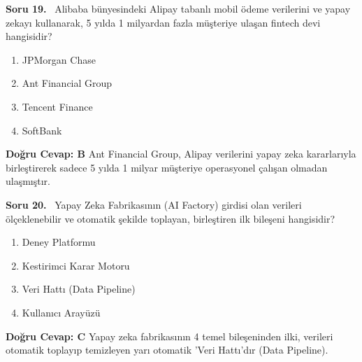 \documentclass[11pt,a4paper,openany]{book}
\begin{document}
\needspace{5cm}
\vspace{8pt}
\noindent\textbf{\large\sffamily Soru 19.} \ Alibaba bünyesindeki Alipay tabanlı mobil ödeme verilerini ve yapay zekayı kullanarak, 5 yılda 1 milyardan fazla müşteriye ulaşan fintech devi hangisidir?
\begin{enumerate}[label=\Alph*), leftmargin=25pt, topsep=4pt, itemsep=2pt]
    \item JPMorgan Chase
    \item Ant Financial Group
    \item Tencent Finance
    \item SoftBank
\end{enumerate}
\vspace{4pt}
\begin{tcolorbox}[title=Cevap ve Açıklama, colback=gray!3!white, colframe=primarycolor!90!black, arc=2mm, fonttitle=\bfseries\sffamily, top=6pt, bottom=6pt]
    \textbf{Doğru Cevap: B}
    \vspace{2pt}
    Ant Financial Group, Alipay verilerini yapay zeka kararlarıyla birleştirerek sadece 5 yılda 1 milyar müşteriye operasyonel çalışan olmadan ulaşmıştır.
\end{tcolorbox}
\vspace{10pt}

\needspace{5cm}
\vspace{8pt}
\noindent\textbf{\large\sffamily Soru 20.} \ Yapay Zeka Fabrikasının (AI Factory) girdisi olan verileri ölçeklenebilir ve otomatik şekilde toplayan, birleştiren ilk bileşeni hangisidir?
\begin{enumerate}[label=\Alph*), leftmargin=25pt, topsep=4pt, itemsep=2pt]
    \item Deney Platformu
    \item Kestirimci Karar Motoru
    \item Veri Hattı (Data Pipeline)
    \item Kullanıcı Arayüzü
\end{enumerate}
\vspace{4pt}
\begin{tcolorbox}[title=Cevap ve Açıklama, colback=gray!3!white, colframe=primarycolor!90!black, arc=2mm, fonttitle=\bfseries\sffamily, top=6pt, bottom=6pt]
    \textbf{Doğru Cevap: C}
    \vspace{2pt}
    Yapay zeka fabrikasının 4 temel bileşeninden ilki, verileri otomatik toplayıp temizleyen yarı otomatik 'Veri Hattı'dır (Data Pipeline).
\end{tcolorbox}
\vspace{10pt}
\end{document}
